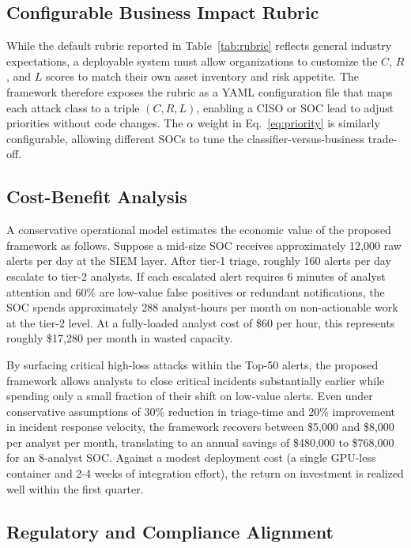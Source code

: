 \documentclass[conference]{IEEEtran}
\begin{document}
\subsection{Configurable Business Impact Rubric}

While the default rubric reported in Table~\ref{tab:rubric} reflects 
general industry expectations, a deployable system must allow 
organizations to customize the $C$, $R$, and $L$ scores to match 
their own asset inventory and risk appetite. The framework therefore 
exposes the rubric as a YAML configuration file that maps each attack 
class to a triple $(C, R, L)$, enabling a CISO or SOC lead to adjust 
priorities without code changes. The $\alpha$ weight in Eq.~\ref{eq:priority} 
is similarly configurable, allowing different SOCs to tune the 
classifier-versus-business trade-off.

\subsection{Cost-Benefit Analysis}

A conservative operational model estimates the economic value of the 
proposed framework as follows. Suppose a mid-size SOC receives approximately 12{,}000 raw alerts per day 
at the SIEM layer. After tier-1 triage, roughly 160 alerts per day escalate 
to tier-2 analysts. If each escalated alert requires 6 minutes of 
analyst attention and 60\% are low-value false positives or redundant 
notifications, the SOC spends approximately 288 analyst-hours per month 
on non-actionable work at the tier-2 level. At a fully-loaded analyst cost of \$60 per hour, this represents 
roughly \$17{,}280 per month in wasted capacity.

By surfacing critical high-loss attacks within the Top-50 alerts, the proposed framework allows analysts to close critical incidents substantially earlier while spending only a small fraction of their shift on low-value alerts. 
Even under conservative assumptions of 30\% reduction in triage-time and 
20\% improvement in incident response velocity, the framework 
recovers between \$5{,}000 and \$8{,}000 per analyst per month, 
translating to an annual savings of \$480{,}000 to \$768{,}000 for 
an 8-analyst SOC. Against a modest deployment cost (a single 
GPU-less container and 2-4 weeks of integration effort), the return 
on investment is realized well within the first quarter.

\subsection{Regulatory and Compliance Alignment}
\end{document}
